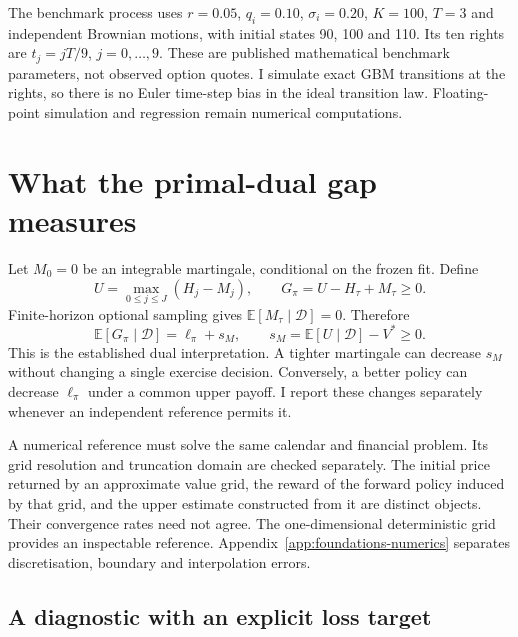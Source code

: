 \documentclass[11pt]{article}
\newcommand{\E}{\mathbb E}
\begin{document}
The benchmark process uses $r=0.05$, $q_i=0.10$, $\sigma_i=0.20$, $K=100$, $T=3$ and independent Brownian motions, with initial states 90, 100 and 110. Its ten rights are $t_j=jT/9$, $j=0,\ldots,9$. These are published mathematical benchmark parameters, not observed option quotes. I simulate exact GBM transitions at the rights, so there is no Euler time-step bias in the ideal transition law. Floating-point simulation and regression remain numerical computations.

\section{What the primal-dual gap measures}

Let $M_0=0$ be an integrable martingale, conditional on the frozen fit. Define
\begin{equation}
 U=\max_{0\le j\le J}(H_j-M_j),\qquad
 G_\pi=U-H_\tau+M_\tau\geq0.
\label{eq:gap}
\end{equation}
Finite-horizon optional sampling gives $\E[M_\tau\mid\mathcal D]=0$. Therefore
\begin{equation}
 \E[G_\pi\mid\mathcal D]=\ell_\pi+s_M,
 \qquad s_M=\E[U\mid\mathcal D]-V^*\geq0.
\label{eq:decomposition}
\end{equation}
This is the established dual interpretation. A tighter martingale can decrease $s_M$ without changing a single exercise decision. Conversely, a better policy can decrease $\ell_\pi$ under a common upper payoff. I report these changes separately whenever an independent reference permits it.

A numerical reference must solve the same calendar and financial problem. Its grid resolution and truncation domain are checked separately. The initial price returned by an approximate value grid, the reward of the forward policy induced by that grid, and the upper estimate constructed from it are distinct objects. Their convergence rates need not agree. The one-dimensional deterministic grid provides an inspectable reference. Appendix~\ref{app:foundations-numerics} separates discretisation, boundary and interpolation errors.

\subsection{A diagnostic with an explicit loss target}
\label{sec:diagnostic}
\end{document}
